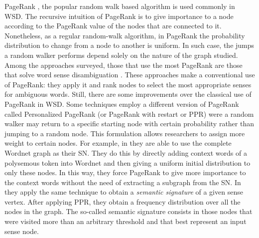 PageRank \cite{Brin1998} , the popular random walk based algorithm is used commonly in WSD. The recursive intuition of PageRank is to give importance to a node according to the PageRank value of the nodes that are connected to it. %
Nonetheless, as a regular random-walk algorithm, in PageRank the probability distribution to change from a node to another is uniform. In such case, the jumps a random walker performs depend solely on the nature of the graph studied. Among the approaches surveyed, those that use the most PageRank are those that solve word sense disambiguation \cite{2004.Mihalcea.SemanticNetworkPageRank,2006.Agirre.TwoGraph-basedAlgorithms,2007.Navigli.GraphConnectivity,2010.Siberer.GraphCooccurrenceWSD}. 
%
These approaches make a conventional use of PageRank: they apply it and rank nodes to select the most appropriate senses for ambiguous words. Still, there are some improvements over the classical use of PageRank in WSD. Some techniques employ a different version of PageRank called Personalized PageRank (or PageRank with restart \cite{Murphy2012} or PPR)  were a random walker may return to a specific starting node with certain probability rather than jumping to a random node. This formulation allows researchers to assign more weight to certain nodes. For example, in \cite{2009.Agirre.PersonalizedPageRankWSD} they are able to use the complete Wordnet graph as their SN. They do this by directly adding context words of a polysemous token into Wordnet and then giving a uniform initial distribution to only these nodes. In this way, they force PageRank to give more importance to the context words without the need of extracting a subgraph from the SN. In \cite{2014.Moro.Navigli.EntityLinking_WSD} they apply the same technique to obtain a \textit{semantic signature} of a given sense vertex. After applying PPR, they obtain a frequency distribution over all the  nodes in the graph. The so-called semantic signature consists in those nodes that were visited more than an arbitrary threshold and that best represent an input sense node.

